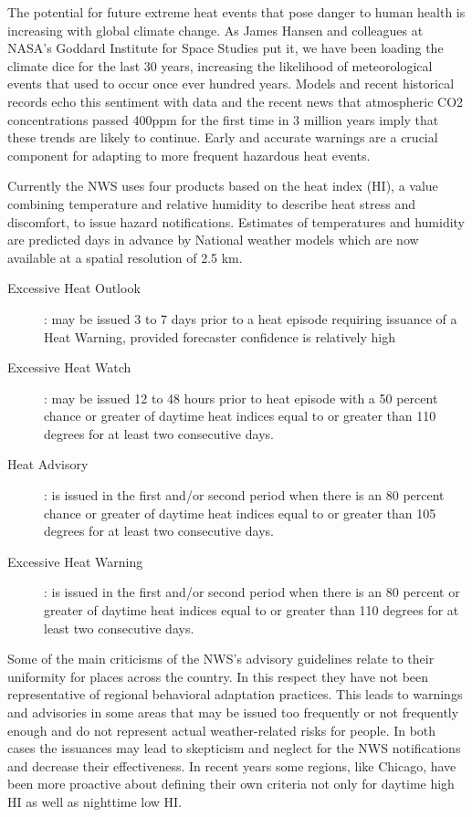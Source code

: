 The potential for future extreme heat events that pose danger to human health is increasing with global climate change. As James Hansen and colleagues at NASA’s Goddard Institute for Space Studies put it, we have been loading the climate dice for the last 30 years, increasing the likelihood of meteorological events that used to occur once ever hundred years. Models and recent historical records echo this sentiment with data and the recent news that atmospheric CO2 concentrations passed 400ppm for the first time in 3 million years imply that these trends are likely to continue.  Early and accurate warnings are a crucial component for adapting to more frequent hazardous heat events.

Currently the NWS uses four products based on the heat index (HI), a value combining temperature and relative humidity to describe heat stress and discomfort, to issue hazard notifications. Estimates of temperatures and humidity are predicted days in advance by National weather models which are now available at a spatial resolution of 2.5 km. 

\begin{description}
\item[Excessive Heat Outlook]: may be issued 3 to 7 days prior to a heat episode requiring issuance of a Heat Warning, provided forecaster confidence is relatively high
\item[Excessive Heat Watch]: may be issued 12 to 48 hours prior to heat episode with a 50 percent chance or greater of daytime heat indices equal to or greater than 110 degrees for at least two consecutive days.
\item[Heat Advisory]: is issued in the first and/or second period when there is an 80 percent chance or greater of daytime heat indices equal to or greater than 105 degrees for at least two consecutive days.
\item[Excessive Heat Warning]: is issued in the first and/or second period when there is an 80 percent or greater of daytime heat indices equal to or greater than 110 degrees for at least two consecutive days.
\end{description}

Some of the main criticisms of the NWS’s advisory guidelines relate to their uniformity for places across the country. In this respect they have not been representative of regional behavioral adaptation practices. This leads to warnings and advisories in some areas that may be issued too frequently or not frequently enough and do not represent actual weather-related risks for people. In both cases the issuances may lead to skepticism and neglect for the NWS notifications and decrease their effectiveness. In recent years some regions, like Chicago, have been more proactive about defining their own criteria not only for daytime high HI as well as nighttime low HI. 




